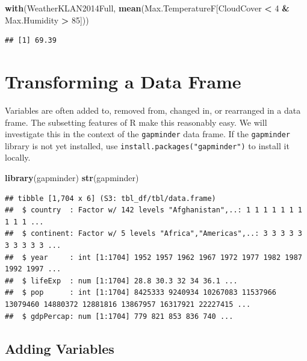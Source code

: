 \documentclass[
]{krantz}
\newenvironment{Shaded}{\begin{snugshade}}{\end{snugshade}}
\newcommand{\DecValTok}[1]{\textcolor[rgb]{0.00,0.00,0.81}{#1}}
\newcommand{\KeywordTok}[1]{\textcolor[rgb]{0.13,0.29,0.53}{\textbf{#1}}}
\newcommand{\NormalTok}[1]{#1}
\newcommand{\OperatorTok}[1]{\textcolor[rgb]{0.81,0.36,0.00}{\textbf{#1}}}
\newcommand{\StringTok}[1]{\textcolor[rgb]{0.31,0.60,0.02}{#1}}
\begin{document}
\begin{Shaded}
\begin{Highlighting}[]
\KeywordTok{with}\NormalTok{(WeatherKLAN2014Full, }
     \KeywordTok{mean}\NormalTok{(Max.TemperatureF[CloudCover }\OperatorTok{\textless{}}\StringTok{ }\DecValTok{4} \OperatorTok{\&}\StringTok{ }\NormalTok{Max.Humidity }\OperatorTok{\textgreater{}}\StringTok{ }\DecValTok{85}\NormalTok{]))}
\end{Highlighting}
\end{Shaded}

\begin{verbatim}
## [1] 69.39
\end{verbatim}

\hypertarget{transforming-a-data-frame}{%
\section{Transforming a Data Frame}\label{transforming-a-data-frame}}

Variables are often added to, removed from, changed in, or rearranged in a data frame. The subsetting features of R make this reasonably easy. We will investigate this in the context of the \texttt{gapminder} data frame. If the \texttt{gapminder} library is not yet installed, use \texttt{install.packages("gapminder")} to install it locally.

\begin{Shaded}
\begin{Highlighting}[]
\KeywordTok{library}\NormalTok{(gapminder)}
\KeywordTok{str}\NormalTok{(gapminder)}
\end{Highlighting}
\end{Shaded}

\begin{verbatim}
## tibble [1,704 x 6] (S3: tbl_df/tbl/data.frame)
##  $ country  : Factor w/ 142 levels "Afghanistan",..: 1 1 1 1 1 1 1 1 1 1 ...
##  $ continent: Factor w/ 5 levels "Africa","Americas",..: 3 3 3 3 3 3 3 3 3 3 ...
##  $ year     : int [1:1704] 1952 1957 1962 1967 1972 1977 1982 1987 1992 1997 ...
##  $ lifeExp  : num [1:1704] 28.8 30.3 32 34 36.1 ...
##  $ pop      : int [1:1704] 8425333 9240934 10267083 11537966 13079460 14880372 12881816 13867957 16317921 22227415 ...
##  $ gdpPercap: num [1:1704] 779 821 853 836 740 ...
\end{verbatim}

\hypertarget{adding-variables}{%
\subsection{Adding Variables}\label{adding-variables}}
\end{document}
